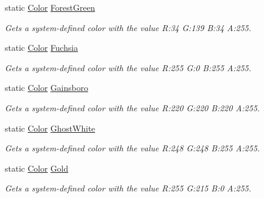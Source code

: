 \begin{DoxyCompactItemize}
static \hyperlink{struct_microsoft_1_1_xna_1_1_framework_1_1_color}{Color} \hyperlink{struct_microsoft_1_1_xna_1_1_framework_1_1_color_a95f604d40708dcb33c60092e24c7d7e6}{Forest\+Green}
\begin{DoxyCompactList}\small\item\em Gets a system-\/defined color with the value R\+:34 G\+:139 B\+:34 A\+:255.\end{DoxyCompactList}\item 
static \hyperlink{struct_microsoft_1_1_xna_1_1_framework_1_1_color}{Color} \hyperlink{struct_microsoft_1_1_xna_1_1_framework_1_1_color_a6ec6b57a97fb16a13982751b05df8079}{Fuchsia}
\begin{DoxyCompactList}\small\item\em Gets a system-\/defined color with the value R\+:255 G\+:0 B\+:255 A\+:255.\end{DoxyCompactList}\item 
static \hyperlink{struct_microsoft_1_1_xna_1_1_framework_1_1_color}{Color} \hyperlink{struct_microsoft_1_1_xna_1_1_framework_1_1_color_a257bfb3afd7fd7072d957a7c76b09114}{Gainsboro}
\begin{DoxyCompactList}\small\item\em Gets a system-\/defined color with the value R\+:220 G\+:220 B\+:220 A\+:255.\end{DoxyCompactList}\item 
static \hyperlink{struct_microsoft_1_1_xna_1_1_framework_1_1_color}{Color} \hyperlink{struct_microsoft_1_1_xna_1_1_framework_1_1_color_aedf35bf29499b07657e3a5428f531200}{Ghost\+White}
\begin{DoxyCompactList}\small\item\em Gets a system-\/defined color with the value R\+:248 G\+:248 B\+:255 A\+:255.\end{DoxyCompactList}\item 
static \hyperlink{struct_microsoft_1_1_xna_1_1_framework_1_1_color}{Color} \hyperlink{struct_microsoft_1_1_xna_1_1_framework_1_1_color_a37f1089253bfa0ea5832ff3d241b9b4b}{Gold}
\begin{DoxyCompactList}\small\item\em Gets a system-\/defined color with the value R\+:255 G\+:215 B\+:0 A\+:255.\end{DoxyCompactList}\item 

\end{DoxyCompactItemize}
